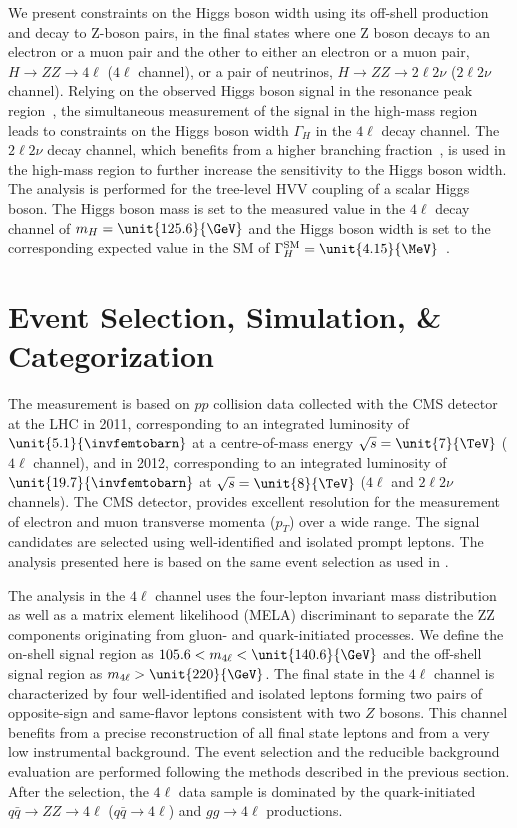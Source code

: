 We present constraints on the Higgs boson width using its off-shell production and decay
to Z-boson pairs, in the final states where one Z boson decays to an electron or a muon pair and the
other to either an electron or a muon pair, $H \to ZZ \to 4\ell$ ($4\ell$ channel), or a pair
of neutrinos, $H \to ZZ \to 2\ell2\nu$ ($2\ell2\nu$ channel). Relying on the observed Higgs boson
signal in the resonance peak region~\cite{Chatrchyan:2013mxa}, the simultaneous measurement of the
signal in the high-mass region leads to constraints on the Higgs boson width $\Gamma_{H}$ in the $4\ell$ decay
channel. The $2\ell 2\nu$ decay channel, which benefits from a higher branching fraction~\cite{Chatrchyan:2013yoa,Chatrchyan:2012ft},
is used in the high-mass region to further increase the sensitivity to the Higgs boson width.
The analysis is performed for the tree-level HVV coupling of a scalar Higgs boson. The Higgs boson mass is set to the
measured value in the $4\ell$ decay channel of $m_H = \unit{125.6}{\GeV}$ \cite{Chatrchyan:2013mxa} and the
Higgs boson width is set to the corresponding expected value in the SM of
$\Gamma_{H}^{\textrm{SM}} = \unit{4.15}{\MeV}$~\cite{Dittmaier:2011ti,Heinemeyer:2013tqa}.

\section{Event Selection, Simulation, \& Categorization}
\label{sec:ZZ4l_ZZ2l2nu_Analysis}

The measurement is based on $pp$ collision data collected with the CMS detector at the LHC in 2011, corresponding to an integrated luminosity of $\unit{5.1}{\invfemtobarn}$ at a centre-of-mass energy $\sqrt{s} = \unit{7}{\TeV}$ ($4\ell$ channel), and in 2012, corresponding to an integrated luminosity of $\unit{19.7}{\invfemtobarn}$ at $\sqrt{s} = \unit{8}{\TeV}$ ($4\ell$ and $2\ell2\nu$ channels). The CMS detector, provides excellent resolution for the measurement of electron and muon transverse momenta ($p_{T}$) over a wide range. The signal candidates are selected using well-identified and isolated prompt leptons. The analysis presented here is based on the same event selection as used in \cite{Chatrchyan:2013mxa,Chatrchyan:2013yoa}.

The analysis in the $4\ell$ channel uses the four-lepton invariant mass distribution as well as a matrix element likelihood (MELA) discriminant to separate the ZZ components originating from gluon- and quark-initiated processes. We define the on-shell signal region as $105.6 < m_{4\ell} < \unit{140.6}{\GeV}$ and the off-shell signal region as  $m_{4\ell} > \unit{220}{\GeV}$. The final state in the $4\ell$ channel is characterized by four well-identified and isolated leptons
forming two pairs of opposite-sign and same-flavor leptons consistent with two $Z$ bosons.
This channel benefits from a precise reconstruction of all final state leptons and from a very low
instrumental background. The event selection and the reducible background evaluation are performed
following the methods described in the previous section.
After the selection, the $4\ell$ data sample is dominated by the quark-initiated
$q\bar{q} \to ZZ \to 4\ell$ ($q\bar{q} \to 4\ell$)
and $gg \to 4\ell$ productions.


